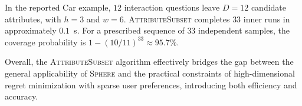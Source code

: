 In the reported Car example, $12$ interaction questions leave $D=12$ candidate attributes, with $h=3$ and $w=6$. \textsc{AttributeSubset} completes $33$ inner runs in approximately $0.1$~s. For a prescribed sequence of $33$ independent samples, the coverage probability is $1-(10/11)^{33}\approx95.7\%$.

Overall, the \textsc{AttributeSubset} algorithm effectively bridges the gap between the general applicability of \textsc{Sphere} and the practical constraints of high-dimensional regret minimization with sparse user preferences, introducing both efficiency and accuracy.

\FloatBarrier
